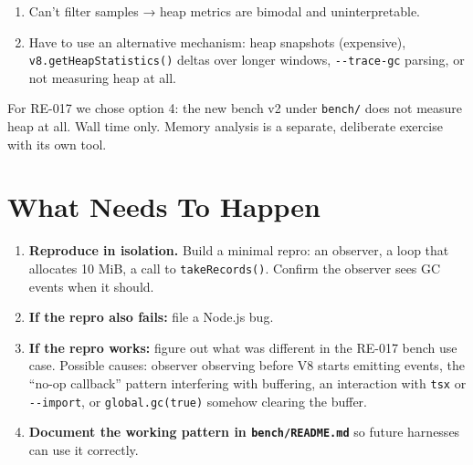 \begin{enumerate}
\def\labelenumi{\arabic{enumi}.}
\tightlist
\item
  Can't filter samples → heap metrics are bimodal and uninterpretable.
\item
  Have to use an alternative mechanism: heap snapshots (expensive), \texttt{v\allowbreak{}8\allowbreak{}.\allowbreak{}g\allowbreak{}e\allowbreak{}t\allowbreak{}H\allowbreak{}e\allowbreak{}a\allowbreak{}p\allowbreak{}S\allowbreak{}t\allowbreak{}a\allowbreak{}t\allowbreak{}i\allowbreak{}s\allowbreak{}t\allowbreak{}i\allowbreak{}c\allowbreak{}s\allowbreak{}(\allowbreak{})} deltas over longer windows, \texttt{-\allowbreak{}-\allowbreak{}t\allowbreak{}r\allowbreak{}a\allowbreak{}c\allowbreak{}e\allowbreak{}-\allowbreak{}g\allowbreak{}c} parsing, or not measuring heap at all.
\end{enumerate}

For RE-017 we chose option 4: the new bench v2 under \texttt{b\allowbreak{}e\allowbreak{}n\allowbreak{}c\allowbreak{}h\allowbreak{}/} does not measure heap at all. Wall time only. Memory analysis is a separate, deliberate exercise with its own tool.

\section{What Needs To Happen}\label{record-310-what-needs-to-happen}

\begin{enumerate}
\def\labelenumi{\arabic{enumi}.}
\tightlist
\item
  \textbf{Reproduce in isolation.} Build a minimal repro: an observer, a loop that allocates 10 MiB, a call to \texttt{t\allowbreak{}a\allowbreak{}k\allowbreak{}e\allowbreak{}R\allowbreak{}e\allowbreak{}c\allowbreak{}o\allowbreak{}r\allowbreak{}d\allowbreak{}s\allowbreak{}(\allowbreak{})}. Confirm the observer sees GC events when it should.
\item
  \textbf{If the repro also fails:} file a Node.js bug.
\item
  \textbf{If the repro works:} figure out what was different in the RE-017 bench use case. Possible causes: observer observing before V8 starts emitting events, the ``no-op callback'' pattern interfering with buffering, an interaction with \texttt{t\allowbreak{}s\allowbreak{}x} or \texttt{-\allowbreak{}-\allowbreak{}i\allowbreak{}m\allowbreak{}p\allowbreak{}o\allowbreak{}r\allowbreak{}t}, or \texttt{g\allowbreak{}l\allowbreak{}o\allowbreak{}b\allowbreak{}a\allowbreak{}l\allowbreak{}.\allowbreak{}g\allowbreak{}c\allowbreak{}(\allowbreak{}t\allowbreak{}r\allowbreak{}u\allowbreak{}e\allowbreak{})} somehow clearing the buffer.
\item
  \textbf{Document the working pattern in \texttt{b\allowbreak{}e\allowbreak{}n\allowbreak{}c\allowbreak{}h\allowbreak{}/\allowbreak{}R\allowbreak{}E\allowbreak{}A\allowbreak{}D\allowbreak{}M\allowbreak{}E\allowbreak{}.\allowbreak{}m\allowbreak{}d}} so future harnesses can use it correctly.
\end{enumerate}

